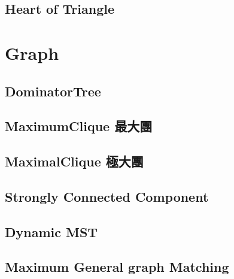 \documentclass[a4paper,10pt,twocolumn,oneside]{article}
\begin{document}
\subsection{Heart of Triangle}


\section{Graph}
% 

\subsection{DominatorTree}


\subsection{MaximumClique 最大團}
% 


\subsection{MaximalClique 極大團}
% 


%

\subsection{Strongly Connected Component}


\subsection{Dynamic MST}


\subsection{Maximum General graph Matching}

\end{document}
